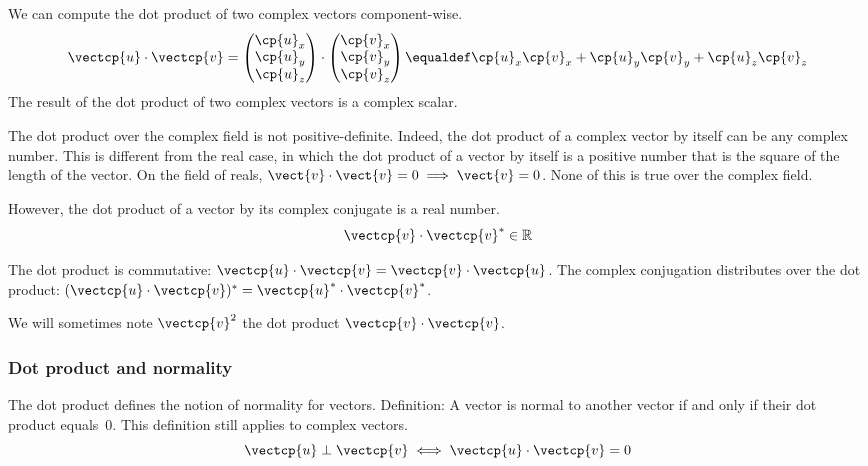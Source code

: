 \begin{refsection}
We can compute the dot product of two complex vectors component-wise.
\begin{equation}
    \vectcp{u} \cdot \vectcp{v}
    =
    \begin{pmatrix}
        \cp{u}_x \\ \cp{u}_y \\ \cp{u}_z
    \end{pmatrix}
    \cdot
    \begin{pmatrix}
        \cp{v}_x \\ \cp{v}_y \\ \cp{v}_z
    \end{pmatrix}
    \equaldef
    \cp{u}_x \cp{v}_x + \cp{u}_y \cp{v}_y + \cp{u}_z \cp{v}_z
\end{equation}
The result of the dot product of two complex vectors is a complex scalar.

The dot product over the complex field is not positive-definite.
Indeed, the dot product of a complex vector by itself can be any complex number.
This is different from the real case, in which the dot product of a vector by itself is a positive number that is the square of the length of the vector.
On the field of reals, $\vect{v} \cdot \vect{v}=0 \implies \vect{v}=0$.
None of this is true over the complex field.

However, the dot product of a vector by its complex conjugate is a real number.
\begin{equation}
    \vectcp{v} \cdot \vectcp{v}^* \in \mathbb{R}
\end{equation}

The dot product is commutative:
$\vectcp{u} \cdot \vectcp{v} = \vectcp{v} \cdot \vectcp{u}$.
The complex conjugation distributes over the dot product:
$(\vectcp{u} \cdot \vectcp{v})^* = \vectcp{u}^* \cdot \vectcp{v}^*$.

We will sometimes note $\vectcp{v}^2$ the dot product $\vectcp{v} \cdot \vectcp{v}$.

\subsubsection{Dot product and normality}

The dot product defines the notion of normality for vectors.
Definition: A vector is normal to another vector if and only if their dot product equals~$0$.
This definition still applies to complex vectors.
\begin{equation}
    \vectcp{u} \perp \vectcp{v}
    \iff
    \vectcp{u} \cdot \vectcp{v} = 0
\end{equation}


\end{refsection}
